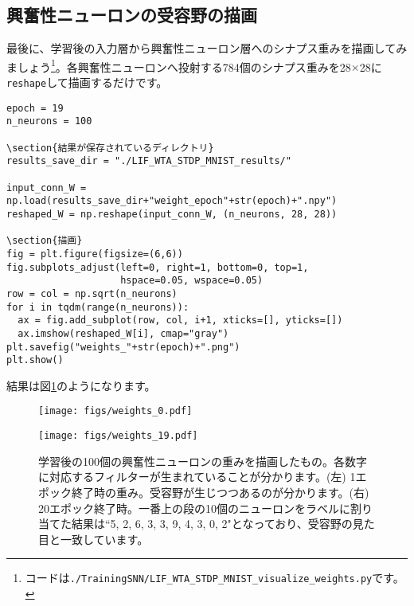 \subsection{興奮性ニューロンの受容野の描画}
最後に、学習後の入力層から興奮性ニューロン層へのシナプス重みを描画してみましょう\footnote{コードは\texttt{./TrainingSNN/LIF\_WTA\_STDP\_MNIST\_visualize\_weights.py}です。}。各興奮性ニューロンへ投射する784個のシナプス重みを28$\times$28に\texttt{reshape}して描画するだけです。
\begin{verbatim}
epoch = 19
n_neurons = 100

\section{結果が保存されているディレクトリ}
results_save_dir = "./LIF_WTA_STDP_MNIST_results/"

input_conn_W = np.load(results_save_dir+"weight_epoch"+str(epoch)+".npy")
reshaped_W = np.reshape(input_conn_W, (n_neurons, 28, 28))

\section{描画}
fig = plt.figure(figsize=(6,6))
fig.subplots_adjust(left=0, right=1, bottom=0, top=1,
                    hspace=0.05, wspace=0.05)
row = col = np.sqrt(n_neurons)
for i in tqdm(range(n_neurons)):
  ax = fig.add_subplot(row, col, i+1, xticks=[], yticks=[])
  ax.imshow(reshaped_W[i], cmap="gray")
plt.savefig("weights_"+str(epoch)+".png")
plt.show()
\end{verbatim}
結果は図\ref{fig:Diehl_weights}のようになります。
\begin{figure}[htbp]
 \begin{minipage}{0.5\hsize}
  \begin{center}
   \texttt{[image: figs/weights\_0.pdf]}
  \end{center}
 \end{minipage}
 \begin{minipage}{0.5\hsize}
  \begin{center}
   \texttt{[image: figs/weights\_19.pdf]}
  \end{center}
 \end{minipage}
\caption{学習後の100個の興奮性ニューロンの重みを描画したもの。各数字に対応するフィルターが生まれていることが分かります。(左) 1エポック終了時の重み。受容野が生じつつあるのが分かります。(右) 20エポック終了時。一番上の段の10個のニューロンをラベルに割り当てた結果は``5, 2, 6, 3, 3, 9, 4, 3, 0, 2"となっており、受容野の見た目と一致しています。}
\label{fig:Diehl_weights}
\end{figure}

